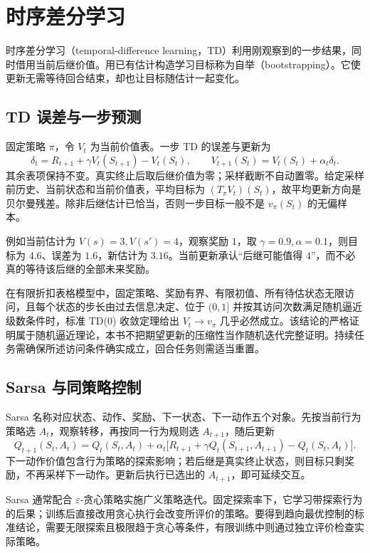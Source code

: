 \documentclass[UTF8,12pt,a4paper,fontset=fandol]{ctexbook}
\begin{document}
\chapter{时序差分学习}
\label{ch:rl-td}

时序差分学习（temporal-difference learning，TD）利用刚观察到的一步结果，同时借用当前后继价值。用已有估计构造学习目标称为自举（bootstrapping）。它使更新无需等待回合结束，却也让目标随估计一起变化。

\section{TD 误差与一步预测}

固定策略 $\pi$，令 $V_t$ 为当前价值表。一步 TD 的误差与更新为
\begin{equation}
\delta_t=R_{t+1}+\gamma V_t(S_{t+1})-V_t(S_t),\qquad
V_{t+1}(S_t)=V_t(S_t)+\alpha_t\delta_t.
\label{eq:rl-td-zero}
\end{equation}
其余表项保持不变。真实终止后取后继价值为零；采样截断不自动置零。给定采样前历史、当前状态和当前价值表，平均目标为 $(T_\pi V_t)(S_t)$，故平均更新方向是贝尔曼残差。除非后继估计已恰当，否则一步目标一般不是 $v_\pi(S_t)$ 的无偏样本。

例如当前估计为 $V(s)=3,V(s')=4$，观察奖励 $1$，取 $\gamma=0.9,\alpha=0.1$，则目标为 $4.6$、误差为 $1.6$，新估计为 $3.16$。当前更新承认“后继可能值得 $4$”，而不必真的等待该后继的全部未来奖励。

在有限折扣表格模型中，固定策略、奖励有界、有限初值、所有待估状态无限访问，且每个状态的步长由过去信息决定、位于 $(0,1]$ 并按其访问次数满足随机逼近级数条件时，标准 TD(0) 收敛定理给出 $V_t\to v_\pi$ 几乎必然成立\cite{sutton-barto}。该结论的严格证明属于随机逼近理论，本书不把期望更新的压缩性当作随机迭代完整证明。持续任务需确保所述访问条件确实成立，回合任务则需适当重置。

\section{Sarsa 与同策略控制}

Sarsa 名称对应状态、动作、奖励、下一状态、下一动作五个对象。先按当前行为策略选 $A_t$，观察转移，再按同一行为规则选 $A_{t+1}$，随后更新
\[
Q_{t+1}(S_t,A_t)=Q_t(S_t,A_t)+\alpha_t
\bigl[R_{t+1}+\gamma Q_t(S_{t+1},A_{t+1})-Q_t(S_t,A_t)\bigr].
\]
下一动作价值包含行为策略的探索影响；若后继是真实终止状态，则目标只剩奖励，不再采样下一动作。更新后执行已选出的 $A_{t+1}$，即可延续交互。

Sarsa 通常配合 $\varepsilon$-贪心策略实施广义策略迭代。固定探索率下，它学习带探索行为的后果；训练后直接改用贪心执行会改变所评价的策略。要得到趋向最优控制的标准结论，需要无限探索且极限趋于贪心等条件，有限训练中则通过独立评价检查实际策略。
\end{document}
